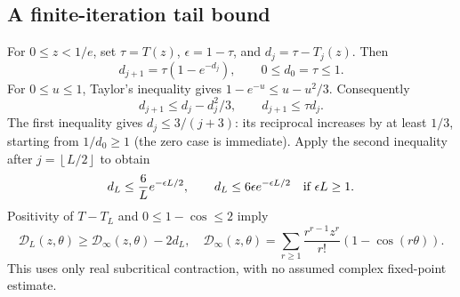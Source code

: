 \documentclass[11pt]{article}
\theoremstyle{remark}\newtheorem{remark}[theorem]{Remark}
\newcommand{\floor}[1]{\left\lfloor #1\right\rfloor}
\begin{document}
\subsection{A finite-iteration tail bound}
For $0\le z<1/e$, set $\tau=T(z)$, $\epsilon=1-\tau$, and
$d_j=\tau-T_j(z)$. Then
\[
 d_{j+1}=\tau(1-e^{-d_j}),\qquad0\le d_0=\tau\le1.
\]
For $0\le u\le1$, Taylor's inequality gives
$1-e^{-u}\le u-u^2/3$. Consequently
\[
 d_{j+1}\le d_j-d_j^2/3,\qquad d_{j+1}\le\tau d_j.
\]
The first inequality gives $d_j\le3/(j+3)$: its reciprocal increases by at
least $1/3$, starting from $1/d_0\ge1$ (the zero case is immediate).
Apply the second inequality after $j=\floor{L/2}$ to obtain
\begin{equation}\label{xtw:airy:eq:truncationtail}
 d_L\le\frac6L e^{-\epsilon L/2},\qquad
 d_L\le6\epsilon e^{-\epsilon L/2}\quad\hbox{if }\epsilon L\ge1.
\end{equation}
Positivity of $T-T_L$ and $0\le1-\cos\le2$ imply
\begin{equation}\label{xtw:airy:eq:truncationdamp}
 \mathcal D_L(z,\theta)\ge\mathcal D_\infty(z,\theta)-2d_L,
 \quad
 \mathcal D_\infty(z,\theta)=
 \sum_{r\ge1}\frac{r^{r-1}z^r}{r!}(1-\cos(r\theta)).
\end{equation}
This uses only real subcritical contraction, with no assumed complex
fixed-point estimate.
\end{document}
